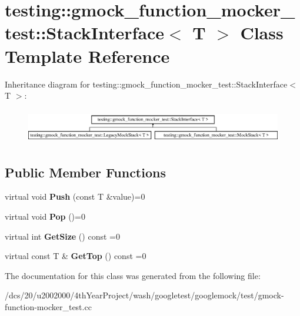 \hypertarget{classtesting_1_1gmock__function__mocker__test_1_1StackInterface}{}\section{testing\+:\+:gmock\+\_\+function\+\_\+mocker\+\_\+test\+:\+:Stack\+Interface$<$ T $>$ Class Template Reference}
\label{classtesting_1_1gmock__function__mocker__test_1_1StackInterface}
Inheritance diagram for testing\+:\+:gmock\+\_\+function\+\_\+mocker\+\_\+test\+:\+:Stack\+Interface$<$ T $>$\+:\begin{figure}[H]
\begin{center}
\leavevmode
\includegraphics[height=1.534247cm]{classtesting_1_1gmock__function__mocker__test_1_1StackInterface}
\end{center}
\end{figure}
\subsection*{Public Member Functions}
\begin{DoxyCompactItemize}
\item 
\mbox{\label{classtesting_1_1gmock__function__mocker__test_1_1StackInterface_a94f18eeca0a9ef27ffdaffab40eaa5b7}} 
virtual void {\bfseries Push} (const T \&value)=0
\item 
\mbox{\label{classtesting_1_1gmock__function__mocker__test_1_1StackInterface_a9316d84cdc42996c0a0a2ae89b693926}} 
virtual void {\bfseries Pop} ()=0
\item 
\mbox{\label{classtesting_1_1gmock__function__mocker__test_1_1StackInterface_a09def067a391dbb6a35d5b52e616774c}} 
virtual int {\bfseries Get\+Size} () const =0
\item 
\mbox{\label{classtesting_1_1gmock__function__mocker__test_1_1StackInterface_a253773e41b8014042ab554d5f8e89e36}} 
virtual const T \& {\bfseries Get\+Top} () const =0
\end{DoxyCompactItemize}


The documentation for this class was generated from the following file\+:\begin{DoxyCompactItemize}
\item 
/dcs/20/u2002000/4th\+Year\+Project/wash/googletest/googlemock/test/gmock-\/function-\/mocker\+\_\+test.\+cc\end{DoxyCompactItemize}
